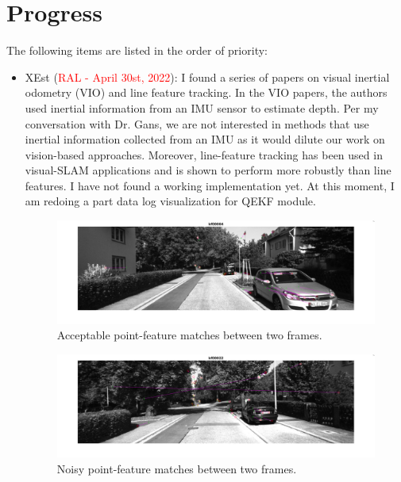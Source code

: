 \documentclass[11pt]{article}
\begin{document}
\section{Progress}
The following items are listed in the order of priority:
\begin{itemize}
    \item XEst (\textcolor{red}{RAL - April 30st, 2022}): I found a series of
    papers on visual inertial odometry (VIO) and line feature tracking. In the VIO
    papers, the authors used inertial information from an IMU sensor to estimate
    depth. Per my conversation with Dr. Gans, we are not  interested in methods
    that use inertial information collected from an IMU as it would dilute our
    work on vision-based approaches. Moreover, line-feature tracking has been
    used in visual-SLAM applications and is shown to perform more robustly than
    line features. I have not found a working implementation yet. At this moment,
    I am redoing a part data log visualization for QEKF module.

    \begin{figure}[H]
      \begin{center}
        \includegraphics[width=\linewidth]{fig_mat-feat_kf00004.png}
      \end{center}
      \caption{Acceptable point-feature matches between two frames.}
    \end{figure}

    \begin{figure}[H]
      \begin{center}
        \includegraphics[width=\linewidth]{fig_mat-feat_kf00022.png}
      \end{center}
      \caption{Noisy point-feature matches between two frames.}
    \end{figure}


\end{itemize}
\end{document}

